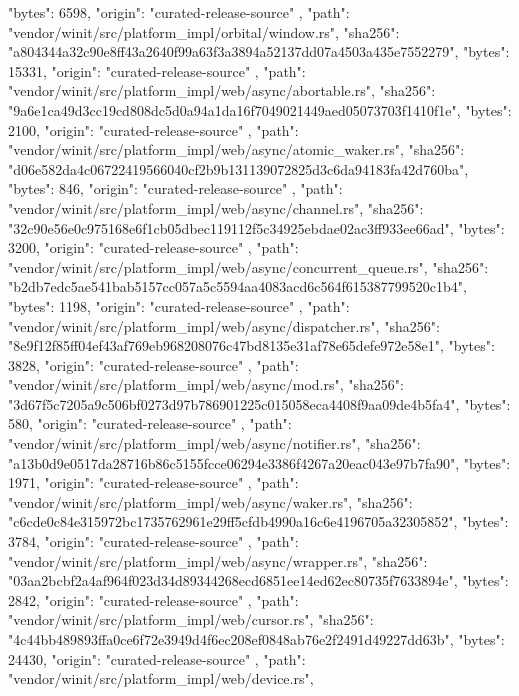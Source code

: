 {{      "bytes": 6598,
      "origin": "curated-release-source"
    },
    {
      "path": "vendor/winit/src/platform_impl/orbital/window.rs",
      "sha256": "a804344a32c90e8ff43a2640f99a63f3a3894a52137dd07a4503a435e7552279",
      "bytes": 15331,
      "origin": "curated-release-source"
    },
    {
      "path": "vendor/winit/src/platform_impl/web/async/abortable.rs",
      "sha256": "9a6e1ca49d3cc19cd808dc5d0a94a1da16f7049021449aed05073703f1410f1e",
      "bytes": 2100,
      "origin": "curated-release-source"
    },
    {
      "path": "vendor/winit/src/platform_impl/web/async/atomic_waker.rs",
      "sha256": "d06e582da4c06722419566040cf2b9b131139072825d3c6da94183fa42d760ba",
      "bytes": 846,
      "origin": "curated-release-source"
    },
    {
      "path": "vendor/winit/src/platform_impl/web/async/channel.rs",
      "sha256": "32c90e56e0c975168e6f1cb05dbec119112f5c34925ebdae02ac3ff933ee66ad",
      "bytes": 3200,
      "origin": "curated-release-source"
    },
    {
      "path": "vendor/winit/src/platform_impl/web/async/concurrent_queue.rs",
      "sha256": "b2db7edc5ae541bab5157cc057a5c5594aa4083acd6c564f615387799520c1b4",
      "bytes": 1198,
      "origin": "curated-release-source"
    },
    {
      "path": "vendor/winit/src/platform_impl/web/async/dispatcher.rs",
      "sha256": "8e9f12f85ff04ef43af769eb968208076c47bd8135e31af78e65defe972e58e1",
      "bytes": 3828,
      "origin": "curated-release-source"
    },
    {
      "path": "vendor/winit/src/platform_impl/web/async/mod.rs",
      "sha256": "3d67f5c7205a9c506bf0273d97b786901225c015058eca4408f9aa09de4b5fa4",
      "bytes": 580,
      "origin": "curated-release-source"
    },
    {
      "path": "vendor/winit/src/platform_impl/web/async/notifier.rs",
      "sha256": "a13b0d9e0517da28716b86c5155fcce06294e3386f4267a20eac043e97b7fa90",
      "bytes": 1971,
      "origin": "curated-release-source"
    },
    {
      "path": "vendor/winit/src/platform_impl/web/async/waker.rs",
      "sha256": "c6cde0c84e315972bc1735762961e29ff5cfdb4990a16c6e4196705a32305852",
      "bytes": 3784,
      "origin": "curated-release-source"
    },
    {
      "path": "vendor/winit/src/platform_impl/web/async/wrapper.rs",
      "sha256": "03aa2bcbf2a4af964f023d34d89344268ecd6851ee14ed62ec80735f7633894e",
      "bytes": 2842,
      "origin": "curated-release-source"
    },
    {
      "path": "vendor/winit/src/platform_impl/web/cursor.rs",
      "sha256": "4c44bb489893ffa0ce6f72e3949d4f6ec208ef0848ab76e2f2491d49227dd63b",
      "bytes": 24430,
      "origin": "curated-release-source"
    },
    {
      "path": "vendor/winit/src/platform_impl/web/device.rs",
}}
